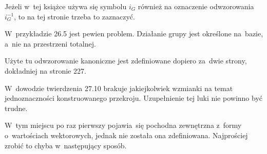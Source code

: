\documentclass[a4paper,11pt]{article}
\begin{document}
\noindent
{} Jeżeli w~tej książce używa się symbolu $i_{ G }$
również na oznaczenie odwzorowania $i_{ G }^{ -1 }$, to na tej stronie
trzeba to zaznaczyć.

\vspace{\spaceFour}



\noindent
{} W~przykładzie 26.5 jest pewien problem. Działanie
grupy jest określone na~bazie, a~nie na przestrzeni totalnej.

\vspace{\spaceFour}





\noindent
{} Użyte tu odwzorowanie kanoniczne jest zdefiniowane
dopiero za~dwie strony, dokładniej na stronie 227.

\vspace{\spaceFour}





\noindent
{} W~dowodzie twierdzenia 27.10 brakuje jakiejkolwiek
wzmianki na temat jednoznaczności konstruowanego przekroju.
Uzupełnienie tej luki nie powinno być trudne.

\vspace{\spaceFour}





\noindent
{} W~tym miejscu po raz pierwszy pojawia~się pochodna
zewnętrzna z~formy o~wartościach wektorowych, jednak nie została ona
zdefiniowana. Najprościej zrobić to chyba w~następujący sposób.





\newpage

\end{document}

